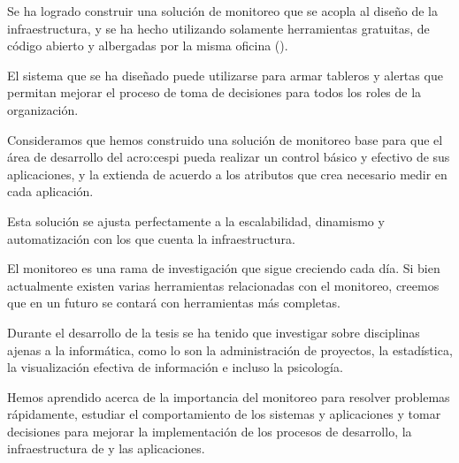 Se ha logrado construir una solución de monitoreo que se acopla al diseño de la
infraestructura, y se ha hecho utilizando solamente herramientas gratuitas,
de código abierto y albergadas por la misma oficina ().

El sistema que se ha diseñado puede utilizarse para armar tableros y alertas
que permitan mejorar el proceso de toma de decisiones para todos los roles de
la organización.

Consideramos que hemos construido una solución de monitoreo base para que el
área de desarrollo del \gls{acro:cespi} pueda realizar un control básico y
efectivo de sus aplicaciones, y la extienda de acuerdo a los atributos que crea
necesario medir en cada aplicación.

Esta solución se ajusta perfectamente a la escalabilidad, dinamismo
y automatización con los que cuenta la infraestructura.

El monitoreo es una rama de investigación que sigue creciendo cada día. Si bien
actualmente existen varias herramientas relacionadas con el monitoreo, creemos
que en un futuro se contará con herramientas más completas.

Durante el desarrollo de la tesis se ha tenido que investigar sobre disciplinas
ajenas a la informática, como lo son la administración de proyectos, la
estadística, la visualización efectiva de información e incluso la psicología.

Hemos aprendido acerca de la importancia del monitoreo para resolver problemas
rápidamente, estudiar el comportamiento de los sistemas y aplicaciones y tomar
decisiones para mejorar la implementación de los procesos de desarrollo, la
infraestructura de  y las aplicaciones.
